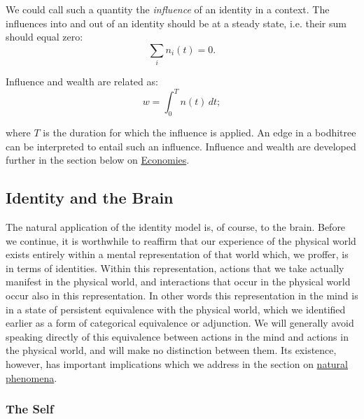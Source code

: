 \documentclass[pra,twocolumn,groupedaddress,10pt]{revtex4}
\theoremstyle{definition}
\begin{document}
We could call such a quantity the \textit{influence} of an identity in a context. The influences into and out of an identity should be at a steady state, i.e. their sum should equal zero:
\begin{equation}
	\sum_{i} n_i(t) = 0 .
\end{equation}

Influence and wealth are related as:
\begin{equation}
	w = \! \int_{0}^{T} n(t)\,dt \label{eq:influence} ;
\end{equation}

where $T$ is the duration for which the influence is applied. An edge in a bodhitree can be interpreted to entail such an influence. Influence and wealth are developed further in the section below on \hyperref[sec:ecogovintpro]{Economies}.


\subsection{Identity and the Brain} \label{sec:idebra}

The natural application of the identity model is, of course, to the brain. Before we continue, it is worthwhile to reaffirm that our experience of the physical world exists entirely within a mental representation of that world which, we proffer, is in terms of identities. Within this representation, actions that we take actually manifest in the physical world, and interactions that occur in the physical world occur also in this representation. In other words this representation in the mind is in a state of persistent equivalence with the physical world, which we identified earlier as a form of categorical equivalence or adjunction. We will generally avoid speaking directly of this equivalence between actions in the mind and actions in the physical world, and will make no distinction between them. Its existence, however, has important implications which we address in the section on \hyperref[sec:natphe]{natural phenomena}.

\subsubsection{The Self} \label{sec:theself}
\end{document}
